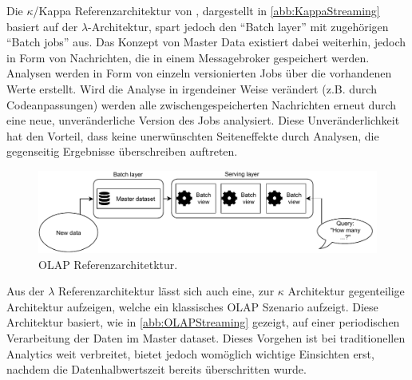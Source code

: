Die $\kappa$/Kappa Referenzarchitektur von \citeauthor{Kreps.2014}, dargestellt in \autoref{abb:KappaStreaming} basiert auf der $\lambda$-Architektur, spart jedoch den \enquote{Batch layer} mit zugehörigen \enquote{Batch jobs} aus. 
Das Konzept von Master Data existiert dabei weiterhin, jedoch in Form von Nachrichten, die in einem Messagebroker gespeichert werden. Analysen werden in Form von einzeln versionierten Jobs über die vorhandenen Werte erstellt. 
Wird die Analyse in irgendeiner Weise verändert (z.B. durch Codeanpassungen) werden alle zwischengespeicherten Nachrichten erneut durch eine neue, unveränderliche Version des Jobs analysiert. Diese Unveränderlichkeit hat den Vorteil, dass keine unerwünschten Seiteneffekte durch Analysen, die gegenseitig Ergebnisse überschreiben auftreten. 




\begin{figure}[H]
\centering
\includegraphics[width=\textwidth]{graphics/OLAP-Reference-Architecture.pdf}
\caption[OLAP Referenzarchitetktur]{OLAP Referenzarchitetktur.\footnotemark}
\label{abb:OLAPStreaming}
\end{figure}

Aus der $\lambda$ Referenzarchitektur lässt sich auch eine, zur $\kappa$ Architektur gegenteilige Architektur aufzeigen, welche ein klassisches \ac{OLAP} Szenario aufzeigt.  Diese Architektur basiert, wie in \autoref{abb:OLAPStreaming} gezeigt, auf einer periodischen Verarbeitung der Daten im Master dataset. Dieses Vorgehen ist bei traditionellen Analytics weit verbreitet, bietet jedoch womöglich wichtige Einsichten erst, nachdem die Datenhalbwertszeit bereits überschritten wurde.





